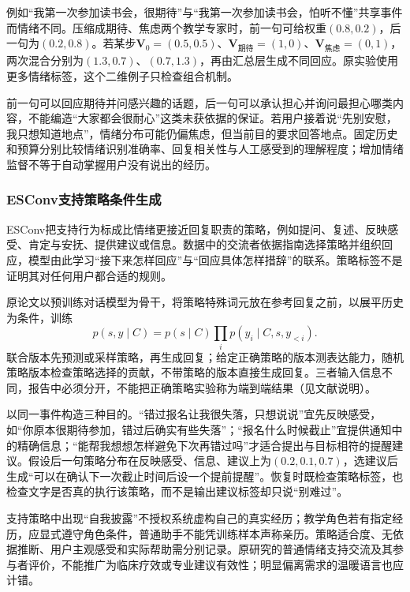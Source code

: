 例如“我第一次参加读书会，很期待”与“我第一次参加读书会，怕听不懂”共享事件而情绪不同。压缩成期待、焦虑两个教学专家时，前一句可给权重$(0.8,0.2)$，后一句为$(0.2,0.8)$。若某步$\bm{V}_0=(0.5,0.5)$、$\bm{V}_{\text{期待}}=(1,0)$、$\bm{V}_{\text{焦虑}}=(0,1)$，两次混合分别为$(1.3,0.7)$、$(0.7,1.3)$，再由汇总层生成不同回应。原实验使用更多情绪标签，这个二维例子只检查组合机制。

前一句可以回应期待并问感兴趣的话题，后一句可以承认担心并询问最担心哪类内容，不能编造“大家都会很耐心”这类未获依据的保证。若用户接着说“先别安慰，我只想知道地点”，情绪分布可能仍偏焦虑，但当前目的要求回答地点。固定历史和预算分别比较情绪识别准确率、回复相关性与人工感受到的理解程度；增加情绪监督不等于自动掌握用户没有说出的经历。

\subsubsection{ESConv支持策略条件生成}
\label{sec:nlp-dialogue-esconv}

ESConv把支持行为标成比情绪更接近回复职责的策略，例如提问、复述、反映感受、肯定与安抚、提供建议或信息。数据中的交流者依据指南选择策略并组织回应，模型由此学习“接下来怎样回应”与“回应具体怎样措辞”的联系。策略标签不是证明其对任何用户都合适的规则。

原论文以预训练对话模型为骨干，将策略特殊词元放在参考回复之前，以展平历史为条件，训练
\begin{equation}
 p(s,y\mid C)=p(s\mid C)\prod_i p(y_i\mid C,s,y_{<i}).
 \label{eq:nlp-dialogue-esconv}
\end{equation}
联合版本先预测或采样策略，再生成回复；给定正确策略的版本测表达能力，随机策略版本检查策略选择的贡献，不带策略的版本直接生成回复。三者输入信息不同，报告中必须分开，不能把正确策略实验称为端到端结果（见文献说明）。

以同一事件构造三种目的。“错过报名让我很失落，只想说说”宜先反映感受，如“你原本很期待参加，错过后确实有些失落”；“报名什么时候截止”宜提供通知中的精确信息；“能帮我想想怎样避免下次再错过吗”才适合提出与目标相符的提醒建议。假设后一句策略分布在反映感受、信息、建议上为$(0.2,0.1,0.7)$，选建议后生成“可以在确认下一次截止时间后设一个提前提醒”。恢复时既检查策略标签，也检查文字是否真的执行该策略，而不是输出建议标签却只说“别难过”。

支持策略中出现“自我披露”不授权系统虚构自己的真实经历；教学角色若有指定经历，应显式遵守角色条件，普通助手不能凭训练样本声称亲历。策略适合度、无依据推断、用户主观感受和实际帮助需分别记录。原研究的普通情绪支持交流及其参与者评价，不能推广为临床疗效或专业建议有效性；明显偏离需求的温暖语言也应计错。

